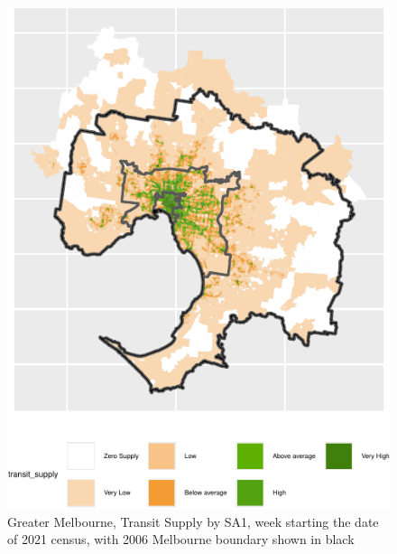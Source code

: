 \documentclass[preprint, 3p,
authoryear]{elsarticle} %
\begin{document}
\begin{figure}
\centering
\includegraphics{Leveraging_GTFS_to_assess_transit_supply_Transport_Geography_files/figure-latex/Greater_Melbourne_SA1_2021_plot-1.pdf}
\caption{Greater Melbourne, Transit Supply by SA1, week starting the
date of 2021 census, with 2006 Melbourne boundary shown in black}
\end{figure}


\end{document}
